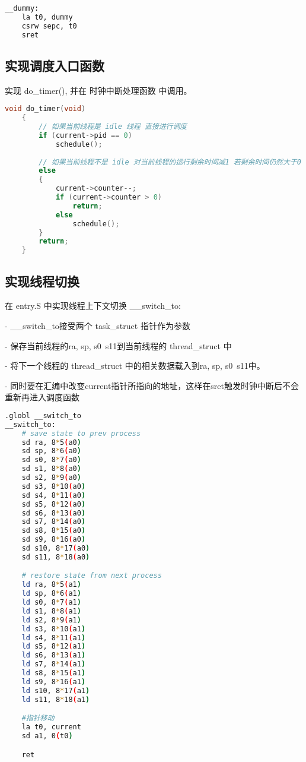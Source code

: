 \documentclass{source/Report}
\begin{document}
\begin{lstlisting}[language = bash, title = {\_\_dummy}]
    __dummy:
    la t0, dummy
    csrw sepc, t0
    sret
\end{lstlisting}

\subsection{实现调度入口函数}

实现 do\_timer(), 并在 时钟中断处理函数 中调用。    

\begin{lstlisting}[language = c, title = {do\_timer}]
    void do_timer(void)
    {
        // 如果当前线程是 idle 线程 直接进行调度
        if (current->pid == 0)
            schedule();
    
        // 如果当前线程不是 idle 对当前线程的运行剩余时间减1 若剩余时间仍然大于0 则直接返回 否则进行调度
        else
        {
            current->counter--;
            if (current->counter > 0)
                return;
            else
                schedule();
        }
        return;
    }
\end{lstlisting}


\subsection{实现线程切换}

在 entry.S 中实现线程上下文切换 \_\_switch\_to:

- \_\_switch\_to接受两个 task\_struct 指针作为参数

- 保存当前线程的ra, sp, s0~s11到当前线程的 thread\_struct 中

- 将下一个线程的 thread\_struct 中的相关数据载入到ra, sp, s0~s11中。

- 同时要在汇编中改变current指针所指向的地址，这样在sret触发时钟中断后不会重新再进入调度函数

\begin{lstlisting}[language = bash, title = {\_\_switch\_to}]
    .globl __switch_to
__switch_to:
    # save state to prev process
    sd ra, 8*5(a0)
    sd sp, 8*6(a0)
    sd s0, 8*7(a0)
    sd s1, 8*8(a0)
    sd s2, 8*9(a0)
    sd s3, 8*10(a0)
    sd s4, 8*11(a0)
    sd s5, 8*12(a0)
    sd s6, 8*13(a0)
    sd s7, 8*14(a0)
    sd s8, 8*15(a0)
    sd s9, 8*16(a0)
    sd s10, 8*17(a0)
    sd s11, 8*18(a0)

    # restore state from next process
    ld ra, 8*5(a1)
    ld sp, 8*6(a1)
    ld s0, 8*7(a1)
    ld s1, 8*8(a1)
    ld s2, 8*9(a1)
    ld s3, 8*10(a1)
    ld s4, 8*11(a1)
    ld s5, 8*12(a1)
    ld s6, 8*13(a1)
    ld s7, 8*14(a1)
    ld s8, 8*15(a1)
    ld s9, 8*16(a1)
    ld s10, 8*17(a1)
    ld s11, 8*18(a1)

    #指针移动
    la t0, current
    sd a1, 0(t0)

    ret
\end{lstlisting}
\end{document}
